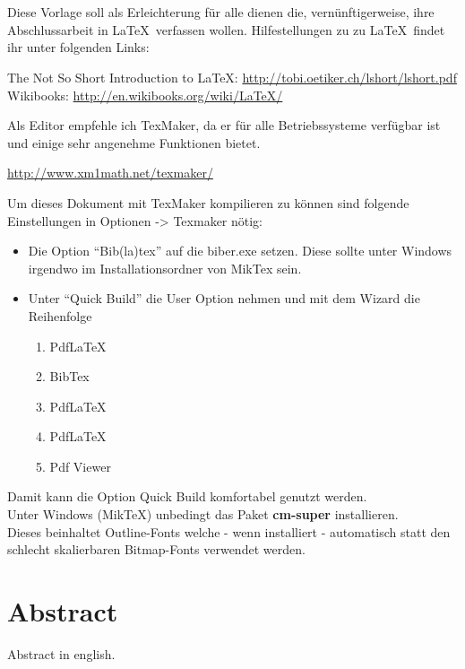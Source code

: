 \chapter*{\abstractname} %
Diese Vorlage soll als Erleichterung für alle dienen die, vernünftigerweise, ihre Abschlussarbeit in \LaTeX \ verfassen wollen. Hilfestellungen zu zu \LaTeX \ findet ihr unter folgenden Links:

\begin{center}
The Not So Short Introduction to \LaTeX: \url{http://tobi.oetiker.ch/lshort/lshort.pdf} \\
Wikibooks: \url{http://en.wikibooks.org/wiki/LaTeX/}
\end{center}

Als Editor empfehle ich TexMaker, da er für alle Betriebssysteme verfügbar ist und einige sehr angenehme Funktionen bietet.
\begin{center}\url{http://www.xm1math.net/texmaker/}\end{center}

Um dieses Dokument mit TexMaker kompilieren zu können sind folgende Einstellungen in Optionen -> Texmaker nötig:
\begin{itemize}
\item Die Option \enquote{Bib(la)tex} auf die biber.exe setzen. Diese sollte unter Windows irgendwo im Installationsordner von MikTex sein.
\item Unter \enquote{Quick Build} die User Option nehmen und mit dem Wizard die Reihenfolge
	\begin{enumerate}
	\item PdfLaTeX
	\item BibTex
	\item PdfLaTeX
	\item PdfLaTeX
	\item Pdf Viewer	
	\end{enumerate}
\end{itemize}
Damit kann die Option Quick Build komfortabel genutzt werden.\\

\noindent Unter Windows (MikTeX) unbedingt das Paket \textbf{cm-super} installieren.\\
Dieses beinhaltet Outline-Fonts welche - wenn installiert - automatisch statt den schlecht skalierbaren Bitmap-Fonts verwendet werden.

\let\oldcleardoublepage\cleardoublepage
\renewcommand\cleardoublepage{}

\chapter*{Abstract}
Abstract in english.

\let\cleardoublepage\oldcleardoublepage
\newpage
